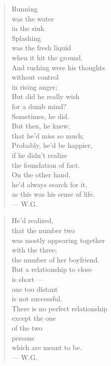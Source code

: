 \begin{quote}
Running \\
was the water \\
in the sink. \\
Splashing \\
was the fresh liquid \\
when it hit the ground. \\
And rushing were his thoughts \\
without control \\
in rising anger; \\
But did he really wish \\
for a dumb mind? \\
Sometimes, he did. \\
But then, he knew, \\
that he'd miss so much; \\
Probably, he'd be happier, \\
if he didn't realize \\
the foundation of fact. \\
On the other hand, \\
he'd always search for it, \\
as this was his sense of life. \\
--- W.G.
\end{quote}

\begin{quote}
He'd realized, \\
that the number two \\
was mostly appearing together \\
with the three; \\
the number of her boyfriend. \\
But a relationship to close \\
is short --- \\
one too distant \\
is not successful. \\
There is no perfect relationship \\
except the one \\
of the two \\
persons \\
which are meant to be. \\
--- W.G.
\end{quote}
